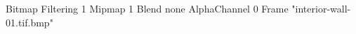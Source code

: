 {Bitmap
	{Filtering 1}
	{Mipmap 1}
	{Blend none}
	{AlphaChannel 0}
	{Frame "interior-wall-01.tif.bmp"}
}
